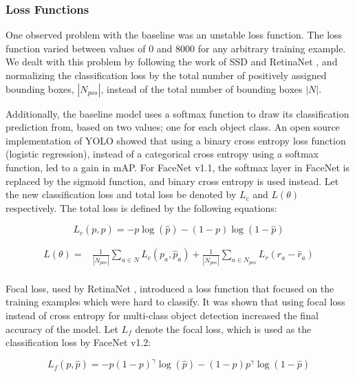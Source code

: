 \documentclass[paperwidth=48in,paperheight=48in, fontscale=0.4166666666666, landscape]{baposter}
\begin{document}
\begin{poster}
{\subsubsection{Loss Functions}
One observed problem with the baseline was an unstable loss function. The loss function varied between values of 0 and 8000 for any arbitrary training example. We dealt with this problem by following the work of SSD \cite{ssd} and RetinaNet \cite{retinanet}, and normalizing the classification loss by the total number of positively assigned bounding boxes, $|N_{pos}|$, instead of the total number of bounding boxes $|N|$.

Additionally, the baseline model uses a softmax function to draw its classification prediction from, based on two values; one for each object class. An open source implementation of YOLO \cite{sigmoidvssoftmax} showed that using a binary cross entropy loss function (logistic regression), instead of a categorical cross entropy using a softmax function, led to a gain in mAP. For FaceNet v1.1, the softmax layer in FaceNet is replaced by the sigmoid function, and binary cross entropy is used instead. Let the new classification loss and total loss be denoted by $L_c$ and $L(\theta)$ respectively. The total loss is defined by the following equations:

\begin{equation}
L_c(p, \hat{p}) = -p \log{(\hat{p})} -(1-p) \log{(1-\hat{p})}
\end{equation}

\begin{equation}
\begin{split}
	L(\theta) = &  \frac{1}{|N_{pos}|} \sum_{a \in N} L_c(p_a, \hat{p}_a) 
	 + \frac{1}{|N_{pos}|} \sum_{a \in N_{pos}} L_r(r_a - \hat{r}_a)  \\ 
\end{split}
\end{equation}

Focal loss, used by RetinaNet \cite{retinanet}, introduced a loss function that focused on the training examples which were hard to classify. It was shown that using focal loss instead of cross entropy for multi-class object detection increased the final accuracy of the model. Let $L_f$ denote the focal loss, which is used as the classification loss by FaceNet v1.2:

\begin{equation}
L_f(p, \hat{p}) = -p (1-p)^\gamma \log{(\hat{p})} -(1-p) p^\gamma\log{(1-\hat{p})}
\end{equation}

}
\end{poster}
\end{document}
